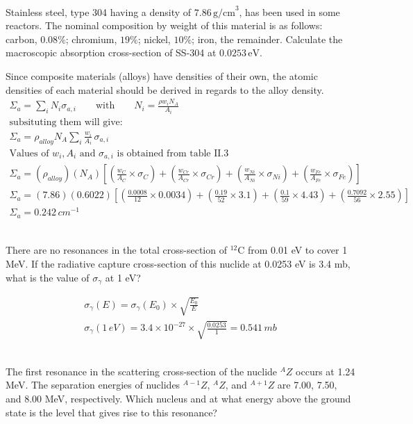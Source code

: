 \documentclass{homework}
\begin{document}
\question \\
Stainless steel, type 304 having a density of $7.86 \,\text{g/cm}^3$, has been used in some reactors. 
The nominal composition by weight of this material is as follows: carbon, $0.08\%$; chromium, $19\%$; nickel, $10\%$; iron, the remainder. 
Calculate the macroscopic absorption cross-section of SS-304 at $0.0253 \,\text{eV}$.

\begin{sol}
\vspace{1em}
\noindent Since composite materials (alloys) have densities of their own, the atomic densities of each material should be derived in regards to the alloy density.
  \begin{gather*}
    \Sigma_a = \sum_i N_i \sigma_{a,i}
    \qquad \text{with} \qquad
    N_i = \frac{\rho w_i N_A}{A_i} \\
    \text{subsituting them will give: } \\
    \boxed{\Sigma_a = \rho_{alloy} N_A \sum_i \frac{w_i}{A_i}\,\sigma_{a,i}}\\
    \text{Values of }w_{i}, A_{i} \text{ and }\sigma_{a,i}\text{ is obtained from table II.3}\\
    \Sigma_a = (\rho_{alloy})(N_A)[(\frac{w_{C}}{A_{C}}\times \sigma_{C})+(\frac{w_{Cr}}{A_{Cr}}\times \sigma_{Cr})+(\frac{w_{Ni}}{A_{Ni}}\times \sigma_{Ni})+(\frac{w_{Fe}}{A_{Fe}}\times \sigma_{Fe})]\\
    \Sigma_a = (7.86)(0.6022)[(\frac{0.0008}{12}\times 0.0034)+(\frac{0.19}{52}\times 3.1)+(\frac{0.1}{59}\times 4.43)+(\frac{0.7092}{56}\times 2.55)]\\
    \Sigma_a = 0.242\,cm^{-1}
  \end{gather*}
\end{sol}

\question \\
There are no resonances in the total cross-section of $^{12}\text{C}$ 
from 0.01 eV to cover 1 MeV. If the radiative capture cross-section of this nuclide 
at 0.0253 eV is 3.4 mb, what is the value of $\sigma_{\gamma}$ at 1 eV?
\begin{sol}
  \begin{gather*}
  \sigma_{\gamma}(E) = \sigma_{\gamma}(E_{0}) \times \sqrt{\frac{E_{0}}{E}} \\
  \sigma_{\gamma}(1\,eV) = 3.4\times 10^{-27} \times \sqrt{\frac{0.0253}{1}} = 0.541\,mb
  \end{gather*}
\end{sol}

\question \\
The first resonance in the scattering cross-section of the nuclide 
$^{A}Z$ occurs at 1.24 MeV. The separation energies of nuclides 
$^{A-1}Z$, $^{A}Z$, and $^{A+1}Z$ are 7.00, 7.50, and 8.00 MeV, respectively. 
Which nucleus and at what energy above the ground state is the level that 
gives rise to this resonance?
\end{document}
